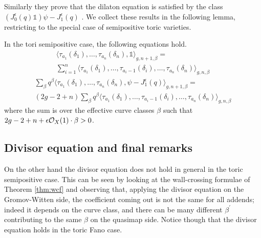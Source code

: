  Similarly they prove that the dilaton equation is satisfied by the class $(J_0^\epsilon(q)\mathds{1})\psi-J_1^\epsilon(q)$ \cite[Lemma 3.4.3]{CF-K-higher-genus}. We collect these results in the following lemma, restricting to the special case of semipositive toric varieties.
 \begin{lemma}
  In the tori semipositive case, the following equations hold.
  \begin{multline}\tag{string}
   \langle \tau_{a_1}(\delta_1),\ldots,\tau_{a_n}(\delta_n), \mathds{1}\rangle_{g,n+1,\beta}= \\
   \sum_{i=1}^n\langle \tau_{a_1}(\delta_1),\ldots,\tau_{a_i-1}(\delta_i),\ldots,\tau_{a_n}(\delta_n)\rangle_{g,n,\beta}
  \end{multline}
 \begin{multline}\tag{dilaton}
  \sum_{\beta}q^\beta\langle \tau_{a_1}(\delta_1),\ldots,\tau_{a_n}(\delta_n), \psi-J^\epsilon_1(q)\rangle_{g,n+1,\beta}= \\
  (2g-2+n)\sum_{\beta}q^\beta\langle \tau_{a_1}(\delta_1),\ldots,\tau_{a_i-1}(\delta_i),\ldots,\tau_{a_n}(\delta_n) \rangle_{g,n,\beta}
 \end{multline}
where the sum is over the effective curve classes $\beta$ such that $2g-2+n+\epsilon\mathcal{O}_X(1)\cdot\beta>0$.
 \end{lemma}

\subsection{Divisor equation and final remarks}\label{sec:Batyrev} On the other hand the divisor equation does not hold in general in the toric semipositive case. This can be seen by looking at the wall-crossing formulae of Theorem \ref{thm:wcf} and observing that, applying the divisor equation on the Gromov-Witten side, the coefficient coming out is not the same for all addends; indeed it depends on the curve class, and there can be many different $\beta^\prime$ contributing to the same $\beta$ on the quasimap side. Notice though that the divisor equation holds in the toric Fano case.

